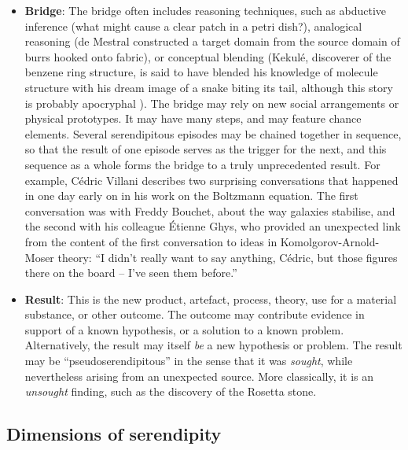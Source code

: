 \begin{itemize}
\item \textbf{Bridge}: The bridge often includes reasoning techniques,
  such as abductive inference (what might cause a clear patch in a
  petri dish?), analogical reasoning (de Mestral constructed a target
  domain from the source domain of burrs hooked onto fabric), or
  conceptual blending (Kekul\'e, discoverer of the benzene ring
  structure, is said to have blended his knowledge of molecule
  structure with his dream image of a snake biting its tail, although
  this story is probably apocryphal
  \cite[p.~xv]{kennedy2016inventology}).  The bridge may rely on new
  social arrangements or physical prototypes.  It may have many steps,
  and may feature chance elements.  Several serendipitous episodes may
  be chained together in sequence, so that the result of one episode
  serves as the trigger for the next, and this sequence as a whole
  forms the bridge to a truly unprecedented result.  For example,
  C\'edric Villani \cite[pp.~15--16]{birth-of-a-theorem} describes
  two surprising conversations that happened in one day early on in
  his work on the Boltzmann equation.  The first conversation was
  with Freddy Bouchet, about the way galaxies stabilise,
   and the second with his colleague \'Etienne Ghys, who provided an
   unexpected link from the content of the first conversation to ideas
   in Komolgorov-Arnold-Moser theory: ``I didn't really want to say
   anything, C\'edric, but those figures there on the board -- I've
   seen them before.''
\end{itemize}

\begin{itemize}
\item \textbf{Result}: This is the new product, artefact, process,
  theory, use for a material substance, or other outcome.  The outcome
  may contribute evidence in support of a known hypothesis, or a
  solution to a known problem.  Alternatively, the result may itself
  {\em be} a new hypothesis or problem.  The result may be
  ``pseudoserendipitous'' in the sense that it was {\em sought}, while
  nevertheless arising from an unexpected source.  More classically,
  it is an \emph{unsought} finding, such as the discovery of the
  Rosetta stone.
\end{itemize}

\subsection{Dimensions of serendipity}\label{sec:dimensions}

